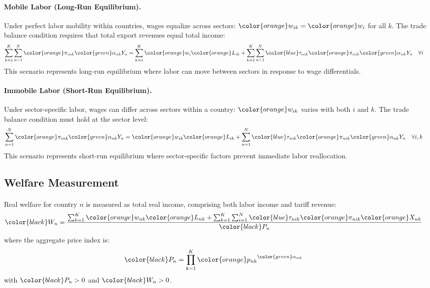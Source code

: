 \paragraph{\textbf{Mobile Labor (Long-Run Equilibrium).}} Under perfect labor mobility within countries, wages equalize across sectors: ${\color{orange}w_{ik}} = {\color{orange}w_{i}}$ for all $k$. The trade balance condition requires that total export revenues equal total income:
\begin{align*}
   \sum_{k=1}^{K} \sum_{n=1}^{N} {\color{orange}\pi_{ink}} {\color{green}\alpha_{nk}} Y_n  &= \sum_{k=1}^{K} {\color{orange}w_{i}} {\color{orange}L_{ik}} + \sum_{k=1}^{K} \sum_{n=1}^{N} {\color{blue}\tau_{nik}} {\color{orange}\pi_{nik}} {\color{green}\alpha_{nk}} Y_{n} \quad \forall i
\end{align*}
This scenario represents long-run equilibrium where labor can move between sectors in response to wage differentials.

\paragraph{\textbf{Immobile Labor (Short-Run Equilibrium).}} Under sector-specific labor, wages can differ across sectors within a country: ${\color{orange}w_{ik}}$ varies with both $i$ and $k$. The trade balance condition must hold at the sector level:
\begin{align*}
   \sum_{n=1}^{N} {\color{orange}\pi_{ink}} {\color{green}\alpha_{nk}} Y_n  &= {\color{orange}w_{ik}} {\color{orange}L_{ik}} + \sum_{n=1}^{N} {\color{blue}\tau_{nik}} {\color{orange}\pi_{nik}} {\color{green}\alpha_{nk}} Y_{n} \quad \forall i,k
\end{align*}
This scenario represents short-run equilibrium where sector-specific factors prevent immediate labor reallocation.

\subsection{Welfare Measurement}

\paragraph{} Real welfare for country $n$ is measured as total real income, comprising both labor income and tariff revenue:
\begin{align*}
    {\color{black}W_n} &= \frac{\sum_{k=1}^{K} {\color{orange}w_{nk}} {\color{orange}L_{nk}} + \sum_{k=1}^{K} \sum_{i=1}^{N} {\color{blue}\tau_{nik}} {\color{orange}\pi_{nik}} {\color{orange}X_{nk}}}{{\color{black}P_n}}
\end{align*}
where the aggregate price index is:
\begin{align*}
    {\color{black}P_n} &= \prod_{k=1}^{K} {\color{orange}p_{nk}}^{{\color{green}\alpha_{nk}}}
\end{align*}
with ${\color{black}P_n} > 0$ and ${\color{black}W_n} > 0$.

